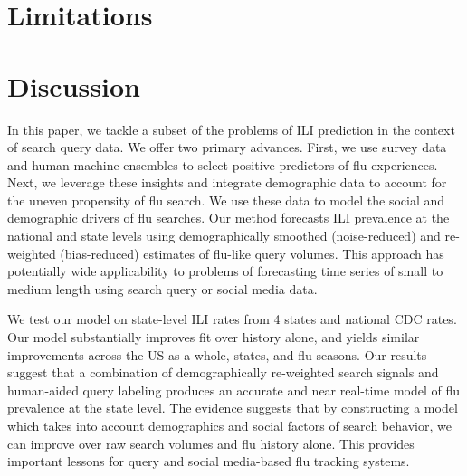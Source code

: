 \documentclass[12pt]{article}
\begin{document}


\section{Limitations}

\section{Discussion}

In this paper, we tackle a subset of the problems of ILI prediction in the context of search query data. We offer two primary advances. First, we use survey data and human-machine ensembles to select positive predictors of flu experiences. Next, we leverage these insights and integrate demographic data to account for the uneven propensity of flu search. We use these data to model the social and demographic drivers of flu searches. Our method forecasts ILI prevalence at the national and state levels using demographically smoothed (noise-reduced) and re-weighted (bias-reduced) estimates of flu-like query volumes. This approach has potentially wide applicability to problems of forecasting time series of small to medium length using search query or social media data. 

We test our model on state-level ILI rates from 4 states and national CDC rates. Our model substantially improves fit over history alone, and yields similar improvements across the US as a whole, states, and flu seasons. Our results suggest that a combination of demographically re-weighted search signals and human-aided query labeling produces an accurate and near real-time model of flu prevalence at the state level. The evidence suggests that by constructing a model which takes into account demographics and social factors of search behavior, we can improve over raw search volumes and flu history alone. This provides important lessons for query and social media-based flu tracking systems. 

\singlespace


\end{document}
